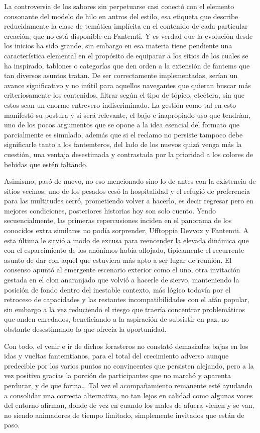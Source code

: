 \documentclass[
]{book}
\begin{document}
La controversia de los sabores sin perpetuarse casi conectó con el elemento consonante del modelo de hilo en antros del estilo, esa etiqueta que describe reducidamente la clase de temática implícita en el contenido de cada particular creación, que no está disponible en Fantemti. Y es verdad que la evolución desde los inicios ha sido grande, sin embargo en esa materia tiene pendiente una característica elemental en el propósito de equiparar a los sitios de los cuales se ha inspirado, tablones o categorías que den orden a la extensión de fantems que tan diversos asuntos tratan. De ser correctamente implementadas, serían un avance significativo y no inútil para aquellos navegantes que quieran buscar más criteriosamente los contenidos, filtrar según el tipo de tópico, etcétera, sin que estos sean un enorme entrevero indiscriminado. La gestión como tal en esto manifestó su postura y si será relevante, el bajo e inapropiado uso que tendrían, uno de los pocos argumentos que se opone a la idea esencial del formato que parcialmente es simulado, además que si el reclamo no persiste tampoco debe significarle tanto a los fantemteros, del lado de los nuevos quizá venga más la cuestión, una ventaja desestimada y contrastada por la prioridad a los colores de bebidas que estén faltando.

Asimismo, pasó de nuevo, no eso mencionado sino lo de antes con la existencia de sitios vecinos, uno de los pesados cesó la hospitalidad y el refugió de preferencia para las multitudes cerró, prometiendo volver a hacerlo, es decir regresar pero en mejores condiciones, posteriores historias hoy son solo cuento. Yendo secuencialmente, las primeras repercusiones inciden en el panorama de los conocidos extra similares no podía sorprender, Ufftoppia Devvox y Fantemti. A esta última le sirvió a modo de excusa para reencender la elevada dinámica que con el esparcimiento de los anónimos había aflojado, típicamente el recurrente asunto de dar con aquel que estuviera más apto a ser lugar de reunión. El consenso apuntó al emergente escenario exterior como el uno, otra invitación gestada en el clon anaranjado que volvió a hacerle de siervo, manteniendo la posición de fondo dentro del inestable contexto, más lógico todavía por el retroceso de capacidades y las restantes incompatibilidades con el afán popular, sin embargo a la vez reduciendo el riesgo que traería concentrar problemáticos que anden enredados, beneficiando a la aspiración de subsistir en paz, no obstante desestimando lo que ofrecía la oportunidad.

Con todo, el venir e ir de dichos forasteros no constató demasiadas bajas en los idas y vueltas fantemtianos, para el total del crecimiento adverso aunque predecible por los varios puntos no convincentes que persisten alejando, pero a la vez positivo gracias la porción de participantes que no marchó y aparenta perdurar, y de que forma\ldots{} Tal vez el acompañamiento remanente esté ayudando a consolidar una correcta alternativa, no tan lejos en calidad como algunas voces del entorno afirman, donde de vez en cuando los males de afuera vienen y se van, no siendo animadores de tiempo limitado, simplemente invitados que están de paso.
\end{document}
